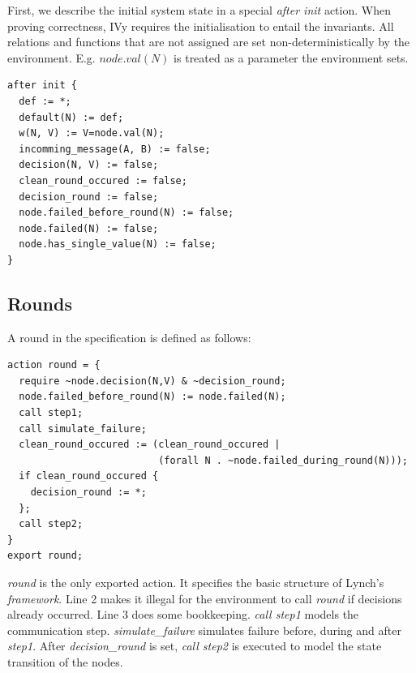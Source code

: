 \documentclass[fleqn]{article}
\begin{document}
First, we describe the initial system state in a special \textit{after init} action. When
proving correctness, IVy requires the initialisation to entail the invariants. All relations and functions
that are not assigned are set non-deterministically by the environment. E.g. $node.val(N)$ is
treated as a parameter the environment sets.

\begin{mdframed}[nobreak=true, backgroundcolor=light-gray, roundcorner=10pt,leftmargin=1, rightmargin=1, innerleftmargin=15, innertopmargin=15,innerbottommargin=15, outerlinewidth=1, linecolor=light-gray]
\begin{lstlisting}
after init {
  def := *;
  default(N) := def;
  w(N, V) := V=node.val(N);
  incomming_message(A, B) := false;
  decision(N, V) := false;
  clean_round_occured := false;
  decision_round := false;
  node.failed_before_round(N) := false;
  node.failed(N) := false;
  node.has_single_value(N) := false;
}
\end{lstlisting}
\end{mdframed}

\subsection{Rounds}

\noindent A round in the specification is defined as follows:
\begin{mdframed}[nobreak=true, backgroundcolor=light-gray, roundcorner=10pt,leftmargin=1, rightmargin=1, innerleftmargin=15, innertopmargin=15,innerbottommargin=15, outerlinewidth=1, linecolor=light-gray]
\begin{lstlisting}
action round = {
  require ~node.decision(N,V) & ~decision_round;
  node.failed_before_round(N) := node.failed(N);
  call step1;
  call simulate_failure;
  clean_round_occured := (clean_round_occured |
                          (forall N . ~node.failed_during_round(N)));
  if clean_round_occured {
    decision_round := *;
  };
  call step2;
}
export round;
\end{lstlisting}
\end{mdframed}

\noindent \textit{round} is the only exported action. It specifies the basic structure of Lynch's \textit{framework}.
\noindent Line 2 makes it illegal for the environment to call \textit{round} if decisions already occurred.
\noindent Line 3 does some bookkeeping.
\textit{call step1} models the communication step. \textit{simulate\_failure} simulates failure before, during
and after \textit{step1}. After \textit{decision\_round} is set, \textit{call step2} is executed to model the state transition of the nodes.
\end{document}
